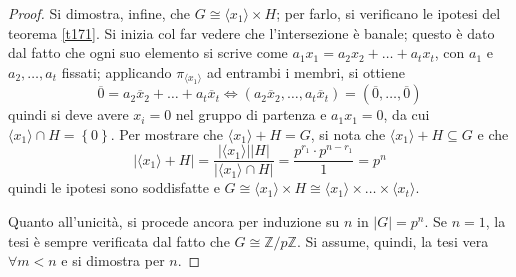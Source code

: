 \documentclass[11pt]{article}
\theoremstyle{style}
\numberwithin{equation}{subsection}
\begin{document}
\begin{proof}
Si dimostra, infine, che $G \cong \langle x_1  \rangle\times H $; per farlo, si verificano le ipotesi del teorema \ref{t171}.
Si inizia col far vedere che l'intersezione \`e banale; questo \`e dato dal fatto che ogni suo elemento si scrive come $a_1x_1 = a_2x_2+ \ldots + a_t x_t$, con $a_1$ e $a_2,\ldots,a_t$ fissati; applicando $\pi_{\langle x_1 \rangle} $ ad entrambi i membri, si ottiene
\[
\overline{0} = a_2 \overline{x}_2 + \ldots + a_t \overline{x}_t \iff (a_2 \overline{x}_2,\ldots, a_t \overline{x}_t) = (\overline{0},\ldots,\overline{0})
\] 
quindi si deve avere $x_i = 0$ nel gruppo di partenza e $a_1 x_1=0$, da cui $\langle x_1 \rangle\cap H = \left\{ 0 \right\} $.
Per  mostrare che $\langle x_1 \rangle+  H = G$, si nota che $\langle x_1 \rangle+ H \subseteq G$ e che
\[
\lvert \langle x_1 \rangle+ H  \rvert = \frac{\lvert \langle x_1 \rangle \rvert \lvert H \rvert }{\lvert \langle x_1 \rangle \cap H\rvert } = \frac{p^{r_1} \cdot p^{n-r_1} }{1}=p^n
\] 
quindi le ipotesi sono soddisfatte e $G \cong \langle x_1 \rangle\times H \cong \langle x_1 \rangle \times  \ldots \times\langle x_t \rangle $.

Quanto all'unicit\`a, si procede ancora per induzione su $n$ in $\lvert G \rvert  = p^n$.
Se $n=1$, la tesi \`e sempre verificata dal fatto che $G \cong \mathbb{Z} / p\mathbb{Z}$.
Si assume, quindi, la tesi vera $\forall m < n$ e si dimostra per $n$.


\end{proof}
\end{document}
